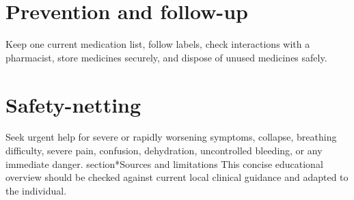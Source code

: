 \section*{Prevention and follow-up}
Keep one current medication list, follow labels, check interactions with a pharmacist, store medicines securely, and dispose of unused medicines safely.
\section*{Safety-netting}
Seek urgent help for severe or rapidly worsening symptoms, collapse, breathing difficulty, severe pain, confusion, dehydration, uncontrolled bleeding, or any immediate danger.
section*{Sources and limitations}
This concise educational overview should be checked against current local clinical guidance and adapted to the individual.
